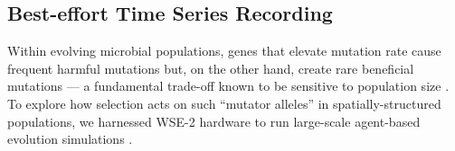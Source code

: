 \vspace{-4.0ex}
\subsection{Best-effort Time Series Recording}
\label{moreno:sec:case2:timeseries}
\vspace{-2.0ex}



Within evolving microbial populations, genes that elevate mutation rate cause frequent harmful mutations but, on the other hand, create rare beneficial mutations --- a fundamental trade-off known to be sensitive to population size \cite{raynes2018sign}.
To explore how selection acts on such ``mutator alleles'' in spatially-structured populations, we harnessed WSE-2 hardware to run large-scale agent-based evolution simulations \cite{moreno2025hypermutatorsc}.

